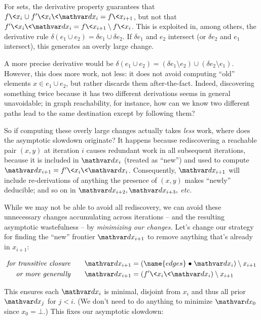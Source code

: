 \noindent
For sets, the derivative property guarantees that $f\<x_i \cup f'\<x_i\<\dx_i = f\<x_{i+1}$, but not that $f'\<x_i\<\dx_i = f\<x_{i+1} \setminus f\<x_i$.
%
This is exploited in, among others, the derivative rule $\delta(e_1 \cup e_2) = \delta e_1 \cup \delta e_2$.
%
If $\delta e_1$ and $e_2$ intersect (or $\delta e_2$ and $e_1$ intersect), this generates an overly large change.

A more precise derivative would be $\delta(e_1 \cup e_2) = (\delta e_1 \setminus e_2) \cup (\delta e_2 \setminus e_1)$.
%
However, this does more work, not less: it does not avoid computing ``old'' elements $x \in e_1 \cup e_2$, but rather discards them after-the-fact.
%
Indeed, discovering something twice because it has two different derivations seems in general unavoidable; in graph reachability, for instance, how can we know two different paths lead to the same destination except by following them?

So if computing these overly large changes actually takes \emph{less} work, where does the asymptotic slowdown originate?
%
It happens because rediscovering a reachable pair $(x,y)$ at iteration $i$ causes redundant work in all subsequent iterations, because it is included in $\dx_i$ (treated as ``new'') and used to compute $\dx_{i+1} = f'\<x_i\<\dx_i$.
%
Consequently, $\dx_{i+1}$ will include re-derivations of anything the presence of $(x,y)$ makes ``newly'' deducible; and so on in $\dx_{i+2}, \dx_{i+3},$ \emph{etc.}

While we may not be able to avoid all rediscovery, we can avoid these unnecessary changes accumulating across iterations -- and the resulting asymptotic wastefulness -- by \emph{minimizing our changes.}
%
Let's change our strategy for finding the ``new'' frontier $\dx_{i+1}$ to remove anything that's already in $x_{i+1}$:

\begin{align*}
  \textit{for transitive closure}
  \qquad
  \dx_{i+1} &= (\name{edges} \relcomp \dx_i) \setminus x_{i+1}
  \\
  \textit{or more generally}
  \qquad
  \dx_{i+1} &= (f' \<x_i \<\dx_i) \setminus x_{i+1}
\end{align*}

\noindent
This ensures each $\dx_i$ is minimal, disjoint from $x_i$ and thus all prior $\dx_j$ for $j < i$. (We don't need to do anything to minimize $\dx_0$ since $x_0 = \bot$.) This fixes our asymptotic slowdown:

